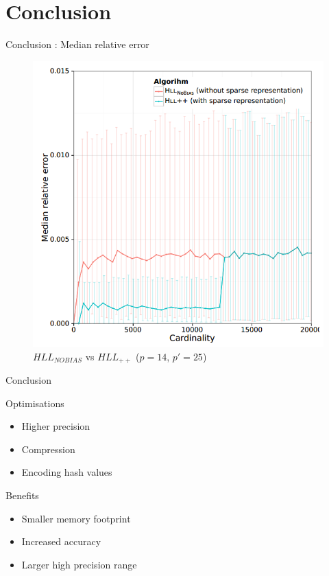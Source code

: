 \documentclass{beamer}
\begin{document}
\section{Conclusion}
\begin{frame}{Conclusion : Median relative error}
  \begin{figure}[c]
    \includegraphics [scale=0.28]  {hll_fig5.png}
    \caption{$HLL_{NOBIAS}$ vs $HLL_{++}$ ($p = 14$, $p' = 25$)}
  \end{figure}
\end{frame}


\begin{frame}{Conclusion}

  \begin{block}{Optimisations}
    \begin{itemize}
      \item Higher precision
      \item Compression
      \item Encoding hash values
    \end{itemize}
  \end{block}


  \begin{block}{Benefits}
    \begin{itemize}
      \item Smaller memory footprint
      \item Increased accuracy
      \item Larger high precision range 
    \end{itemize}
  \end{block}

\end{frame}
\end{document}
